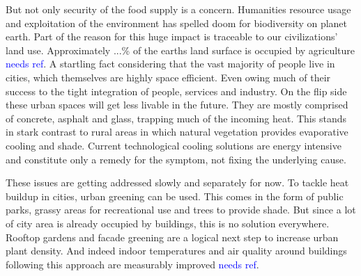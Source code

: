 But not only security of the food supply is a concern.
Humanities resource usage and exploitation of the environment has spelled doom for biodiversity on planet earth.
Part of the reason for this huge impact is traceable to our civilizations' land use.
Approximately ...\% of the earths land surface is occupied by agriculture \textcolor{blue}{needs ref}.
A startling fact considering that the vast majority of people live in cities, which themselves are highly space efficient.
Even owing much of their success to the tight integration of people, services and industry.
On the flip side these urban spaces will get less livable in the future.
They are mostly comprised of concrete, asphalt and glass, trapping much of the incoming heat.
This stands in stark contrast to rural areas in which natural vegetation provides evaporative cooling and shade.
Current technological cooling solutions are energy intensive and constitute only a remedy for the symptom, not fixing the underlying cause.



These issues are getting addressed slowly and separately for now.
To tackle heat buildup in cities, urban greening can be used.
This comes in the form of public parks, grassy areas for recreational use and trees to provide shade.
But since a lot of city area is already occupied by buildings, this is no solution everywhere.
Rooftop gardens and facade greening are a logical next step to increase urban plant density.
And indeed indoor temperatures and air quality around buildings following this approach are measurably improved \textcolor{blue}{needs ref}.

